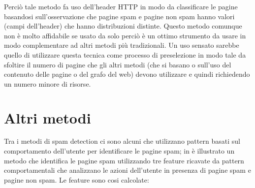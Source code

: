 Perciò tale metodo fa uso dell'header HTTP in modo da classificare le pagine basandosi sull'osservazione che pagine spam e pagine non spam hanno valori (campi dell'header) che hanno distribuzioni distinte. Questo metodo comunque non è molto affidabile se usato da solo perciò è un ottimo strumento da usare in modo complementare ad altri metodi più tradizionali. Un uso sensato sarebbe quello di utilizzare questa tecnica come processo di preselezione in modo tale da sfoltire il numero di pagine che gli altri metodi (che si basano o sull'uso del contenuto delle pagine o del grafo del web) devono utilizzare e quindi richiedendo un numero minore di risorse.

\section{Altri metodi}
 Tra i metodi di spam detection ci sono alcuni che utilizzano pattern basati sul comportamento dell'utente per identificare le pagine spam; in \cite{Liu:2008:UBO:1367497.1367645} è illustrato un metodo che identifica le pagine spam utilizzando tre feature ricavate da pattern comportamentali che analizzano le azioni dell'utente in presenza di pagine spam e pagine non spam. Le feature sono cosi calcolate:
